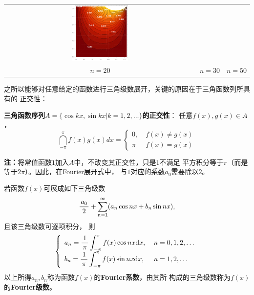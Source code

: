 \begin{shaded}
\begin{center}
\begin{tabular}{ccc}
			\includegraphics[width=0.3\textwidth]{./images/ch12/n50.pdf}\\
			$n=20$ & $n=30$ & $n=50$
		\end{tabular}
	\end{center}
\end{shaded}
 
之所以能够对任意给定的函数进行三角级数展开，关键的原因在于三角函数列所具有的
{\kaishu 正交性}：

\begin{thx}
	{\bf 三角函数序列$A=\{\cos kx,\sin kx|k=1,2,\ldots\}$的正交性}：
	任意$f(x),g(x)\in A$，
	$$\dint_{-\pi}^{\pi}f(x)g(x)dx=\left\{\begin{array}{ll}
	0,\;& f(x)\ne g(x)\\ \pi\;& f(x)=g(x)
	\end{array}\right.$$
\end{thx}

{\bf 注：}将常值函数$1$加入$A$中，不改变其正交性，只是$1$不满足
平方积分等于$\pi$（而是等于$2\pi$）。因此，在Fourier展开式中，
与$1$对应的系数$a_0$需要除以$2$。

\begin{thx}
	若函数$f(x)$可展成如下三角级数
	$$\displaystyle\frac{\,{a_0}\,}{\,{2}\,}+\sum\limits_{n=1}^{\infty}(a_n\cos nx+b_n\sin nx),$$
	且该三角级数可逐项积分， 则
	$$\left\{\begin{array}{ll}
	a_n=\displaystyle\frac{\,{1}\,}{\,{\pi}\,}\displaystyle\int_{-\pi}^{\pi}f(x)\cos nx\mathrm{d} x,\;& n=0,1,2,\ldots\\[5pt]
	b_n=\displaystyle\frac{\,{1}\,}{\,{\pi}\,}\displaystyle\int_{-\pi}^{\pi}f(x)\sin nx\mathrm{d} x,\;& n=1,2,\ldots
	\end{array}\right.$$
	以上所得$a_n,b_n$称为函数$f(x)$的{\bf Fourier系数}，由其所
	构成的三角级数称为$f(x)$的{\bf Fourier级数}。
\end{thx}

